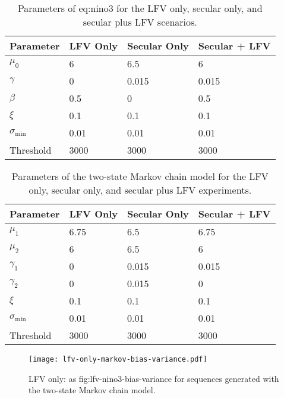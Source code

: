 \documentclass[
      draft,
      ef,
]{agutexSI2019}
\begin{document}
    \begin{table}[ht]
      \centering
      \begin{tabular}{llll}
        \toprule
        Parameter & LFV Only & Secular Only & Secular + LFV \\
        \midrule
        $\mu_0$             & 6     & 6.5   & 6 \\
        $\gamma$            & 0     & 0.015 & 0.015\\
        $\beta$             & 0.5   & 0     & 0.5\\
        $\xi$               & 0.1   & 0.1   & 0.1\\
        $\sigma_\text{min}$ & 0.01  & 0.01  & 0.01\\
        Threshold           & 3000  & 3000  & 3000 \\
        \bottomrule
      \end{tabular}
      \caption{
        Parameters of {eq:nino3} for the LFV only, secular only, and secular plus LFV scenarios.
      }\label{tab:nino-stationary}
    \end{table}

    \begin{table}[ht]
      \centering
      \begin{tabular}{llll}
        \toprule
        Parameter & LFV Only & Secular Only & Secular + LFV \\
        \midrule
        $\mu_1$             & 6.75  & 6.5   & 6.75\\
        $\mu_2$             & 6     & 6.5   & 6\\
        $\gamma_1$          & 0     & 0.015 & 0.015\\
        $\gamma_2$          & 0     & 0.015 & 0\\
        $\xi$               & 0.1   & 0.1   & 0.1\\
        $\sigma_\text{min}$ & 0.01  & 0.01  & 0.01\\
        Threshold           & 3000  & 3000  & 3000 \\
        \bottomrule
      \end{tabular}
      \caption{
        Parameters of the two-state Markov chain model for the LFV only, secular only, and secular plus LFV experiments.
      }\label{tab:markov-stationary}
    \end{table}
    \begin{figure}
      \centering
      \texttt{[image: lfv-only-markov-bias-variance.pdf]}
      \caption{
        LFV only: as {fig:lfv-nino3-bias-variance} for sequences generated with the two-state Markov chain model.
      }\label{fig:lfv-markov-bias-variance}
    \end{figure}
    
\end{document}
